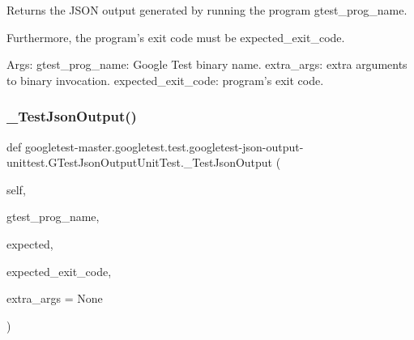 \begin{DoxyVerb}Returns the JSON output generated by running the program gtest_prog_name.

Furthermore, the program's exit code must be expected_exit_code.

Args:
  gtest_prog_name: Google Test binary name.
  extra_args: extra arguments to binary invocation.
  expected_exit_code: program's exit code.
\end{DoxyVerb}
 \mbox{\label{classgoogletest-master_1_1googletest_1_1test_1_1googletest-json-output-unittest_1_1_g_test_json_output_unit_test_ad27da27ebaa9a09128333ff3550f8cc4}} 
\subsubsection{\texorpdfstring{\_TestJsonOutput()}{\_TestJsonOutput()}}
{\footnotesize\ttfamily def googletest-\/master.\+googletest.\+test.\+googletest-\/json-\/output-\/unittest.\+G\+Test\+Json\+Output\+Unit\+Test.\+\_\+\+Test\+Json\+Output (\begin{DoxyParamCaption}\item[{}]{self,  }\item[{}]{gtest\+\_\+prog\+\_\+name,  }\item[{}]{expected,  }\item[{}]{expected\+\_\+exit\+\_\+code,  }\item[{}]{extra\+\_\+args = {\ttfamily None} }\end{DoxyParamCaption})\hspace{0.3cm}{\ttfamily [private]}}

